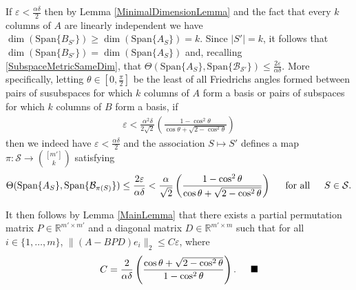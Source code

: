 \documentclass[journal,onecolumn]{IEEEtran}
\begin{document}
If $\varepsilon < \frac{\alpha\delta}{2}$ then by Lemma \ref{MinimalDimensionLemma} and the fact that every $k$ columns of $A$ are linearly independent we have $\dim(\text{Span}\{B_{S'}\}) \geq \dim(\text{Span}\{A_S\}) = k$. Since $|S'| = k$, it follows that $\dim(\text{Span}\{B_{S'}\}) = \dim(\text{Span}\{A_S\})$ and, recalling \eqref{SubspaceMetricSameDim}, that $\Theta(\text{Span}\{A_S\}, \text{Span}\{\mathcal{B_{S'}}\}) \leq \frac{ 2 \varepsilon }{ \alpha \delta }$. More specifically, letting $\theta \in [0, \frac{\pi}{2}]$ be the least of all Friedrichs angles formed between pairs of susubspaces for which $k$ columns of $A$ form a basis or pairs of subspaces for which $k$ columns of $B$ form a basis, if
\begin{align}
\varepsilon < \frac{\alpha^2\delta}{2\sqrt{2}} \left( \frac{1 - \cos^2\theta}{\cos\theta + \sqrt{2 - \cos^2\theta}} \right)
\end{align}
%
then we indeed have $\varepsilon < \frac{ \alpha \delta }{2}$ and the association $S \mapsto S'$ defines a map $\pi: \mathcal{S} \to {[m'] \choose k}$ satisfying 
\begin{align}\label{SubspaceDistanceUpperBound}
\Theta(\text{Span}\{A_S\}, \text{Span}\{\mathcal{B}_{\pi(S)}\}) \leq \frac{ 2 \varepsilon }{ \alpha \delta } < \frac{\alpha}{\sqrt{2}} \left( \frac{1 - \cos^2\theta}{\cos\theta + \sqrt{2 - \cos^2\theta}} \right)
\indent \text{for all} \indent S \in \mathcal{S}.
\end{align}

It then follows by Lemma \ref{MainLemma} that there exists a partial permutation matrix $P \in \mathbb{R}^{m' \times m'}$ and a diagonal matrix $D \in \mathbb{R}^{m' \times m}$ such that for all $i \in \{1, \ldots, m\}$,
$\|(A - BPD)e_i\|_2 \leq C\varepsilon$, where
\begin{align}
C = \frac{2}{\alpha\delta} \left( \frac{\cos\theta + \sqrt{2 - \cos^2\theta}}{1 - \cos^2\theta} \right).  \indent \blacksquare
\end{align}

\end{document}
